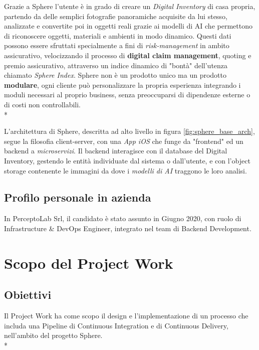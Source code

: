 \documentclass[../main.tex]{subfiles}
\begin{document}
    			Grazie a Sphere\cite{plab_sphere} l'utente è in grado di creare un \emph{Digital Inventory} di casa propria, partendo da delle semplici fotografie panoramiche acquisite da lui stesso, analizzate e convertite poi in oggetti reali grazie ai modelli di AI che permettono di riconoscere oggetti, materiali e ambienti in modo dinamico. Questi dati possono essere sfruttati specialmente a fini di \emph{risk-management} in ambito assicurativo, velocizzando il processo di \textbf{digital claim management}, quoting e premio assicurativo, attraverso un indice dinamico di "bontà" dell'utenza chiamato \emph{Sphere Index}. Sphere non è un prodotto unico ma un prodotto \textbf{modulare}, ogni cliente può personalizzare la propria esperienza integrando i moduli necessari al proprio business, senza preoccuparsi di dipendenze esterne o di costi non controllabili.\\*
        	    
        	    L'architettura di Sphere, descritta ad alto livello in figura \ref{fig:sphere_base_arch}, segue la filosofia client-server, con una \emph{App iOS} che funge da "frontend" ed un backend a \emph{microservizi}. Il backend interagisce con il database del Digital Inventory, gestendo le entità individuate dal sistema o dall'utente, e con l'object storage contenente le immagini da dove i \emph{modelli di AI} traggono le loro analisi.
    	
    		\subsection*{Profilo personale in azienda}
    		
    			In PerceptoLab Srl, il candidato è stato assunto in Giugno 2020, con ruolo di Infrastructure \& DevOps Engineer, integrato nel team di Backend Development.
    	
    	\section*{Scopo del Project Work}
    	
    		\subsection*{Obiettivi}
    	
    			Il Project Work ha come scopo il design e l'implementazione di un processo che includa una Pipeline di Continuous Integration e di Continuous Delivery, nell'ambito del progetto Sphere.\\*
    			
\end{document}
